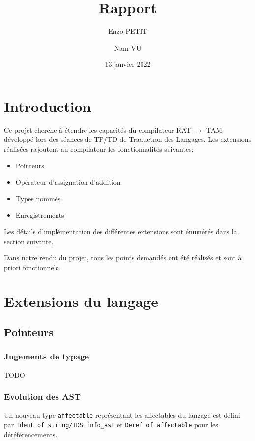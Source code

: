 \documentclass[headings=standardclasses,parskip=half]{scrartcl}
\title{Rapport}
\subtitle{}
\author{Enzo PETIT \and Nam VU}
\date{13 janvier 2022}
\begin{document}
\maketitle

\tableofcontents

\pagebreak

\section{Introduction}
Ce projet cherche à étendre les capacités du compilateur RAT \(\to\)
TAM développé lors des séances de TP/TD de Traduction des Langages.
Les extensions réalisées rajoutent au compilateur
les fonctionnalités suivantes:

\begin{itemize}
    \item Pointeurs
    \item Opérateur d'assignation d'addition
    \item Types nommés
    \item Enregistrements
\end{itemize}

Les détails d'implémentation des différentes extensions sont énumérés
dans la section suivante.

Dans notre rendu du projet, tous les points demandés ont été réalisés
et sont à priori fonctionnels.

\section{Extensions du langage}

\subsection{Pointeurs}

\subsubsection*{Jugements de typage}

TODO

\subsubsection*{Evolution des AST}

Un nouveau type \texttt{affectable} représentant les affectables du
langage est défini par \texttt{Ident of string/TDS.info\_ast} et
\texttt{Deref of affectable} pour les déréférencements.
\end{document}
